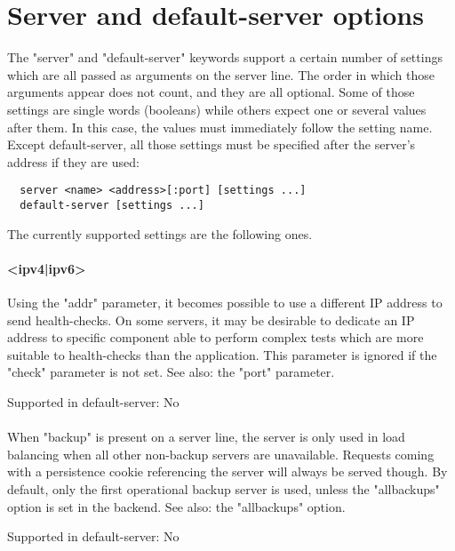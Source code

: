 \chapter{Server and default-server options}
\label{chap:server_options}

The "server" and "default-server" keywords support a certain number of settings
which are all passed as arguments on the server line. The order in which those
arguments appear does not count, and they are all optional. Some of those
settings are single words (booleans) while others expect one or several values
after them. In this case, the values must immediately follow the setting name.
Except default-server, all those settings must be specified after the server's
address if they are used:

\begin{verbatim}
  server <name> <address>[:port] [settings ...]
  default-server [settings ...]
\end{verbatim}

The currently supported settings are the following ones.

\subsubsection[addr]{ <ipv4|ipv6>}
  Using the "addr" parameter, it becomes possible to use a different IP address
  to send health-checks. On some servers, it may be desirable to dedicate an IP
  address to specific component able to perform complex tests which are more
  suitable to health-checks than the application. This parameter is ignored if
  the "check" parameter is not set. See also: the "port" parameter.

  Supported in default-server: No

\subsubsection[backup]{}
  When "backup" is present on a server line, the server is only used in load
  balancing when all other non-backup servers are unavailable. Requests coming
  with a persistence cookie referencing the server will always be served
  though. By default, only the first operational backup server is used, unless
  the "allbackups" option is set in the backend. See also: the "allbackups"
  option.

  Supported in default-server: No

